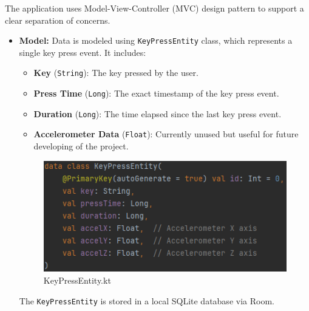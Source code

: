 The application uses Model-View-Controller (MVC) design pattern to support a clear separation of concerns. 
\begin{itemize}
	\item \textbf{Model:} Data is modeled using \texttt{KeyPressEntity} class, which represents a single key press event. It includes: 
	\begin{itemize}
		\item \textbf{Key} (\texttt{String}): The key pressed by the user.
		\item \textbf{Press Time} (\texttt{Long}): The exact timestamp of the key press event.
		\item \textbf{Duration} (\texttt{Long}): The time elapsed since the last key press event.
		\item \textbf{Accelerometer Data} (\texttt{Float}): Currently unused but useful for future developing of the project. 
	\end{itemize}
	\begin{figure}[h!]
		\centering
		\includegraphics[width=0.8\linewidth]{images/DataModel.png}
		\caption{KeyPressEntity.kt}
		\label{fig:main_view}
	\end{figure}
	
	The \texttt{KeyPressEntity} is stored in a local SQLite database via Room.
	

\end{itemize}

